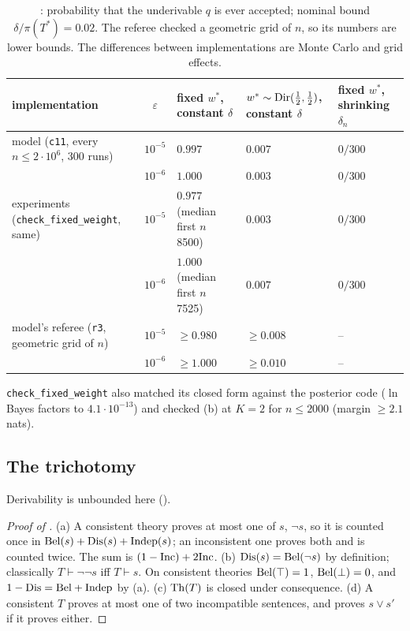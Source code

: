 \begin{table}[ht]
\centering\footnotesize
\begin{tabularx}{\textwidth}{@{}>{\raggedright\arraybackslash}Xc>{\raggedright\arraybackslash}p{2.9cm}>{\raggedright\arraybackslash}p{2.4cm}>{\raggedright\arraybackslash}p{2.0cm}@{}}
\toprule
implementation & $\varepsilon$ & fixed $w^*$, constant $\delta$ & $w^*\sim\mathrm{Dir}(\tfrac12,\tfrac12)$, constant $\delta$ & fixed $w^*$, shrinking $\delta_n$\\
\midrule
model (\texttt{c11}, every $n\le2\cdot10^6$, 300 runs) & $10^{-5}$ & $0.997$ & $0.007$ & $0/300$\\
 & $10^{-6}$ & $1.000$ & $0.003$ & $0/300$\\
experiments (\texttt{check\_fixed\_weight}, same) & $10^{-5}$ & $0.977$ (median first $n$ 8500) & $0.003$ & $0/300$\\
 & $10^{-6}$ & $1.000$ (median first $n$ 7525) & $0.007$ & $0/300$\\
model's referee (\texttt{r3}, geometric grid of $n$) & $10^{-5}$ & $\ge0.980$ & $\ge0.008$ & --\\
 & $10^{-6}$ & $\ge1.000$ & $\ge0.010$ & --\\
\bottomrule
\end{tabularx}
\caption{: probability that the underivable $q$ is ever accepted; nominal bound $\delta/\pi(T^*)=0.02$. The referee checked a geometric grid of $n$, so its numbers are lower bounds. The differences between implementations are Monte Carlo and grid effects.}\label{tab:sound:constant}
\end{table}

\noindent \texttt{check\_fixed\_weight} also matched its closed form against the posterior code ($\ln$ Bayes factors to $4.1\cdot10^{-13}$) and checked (b) at $K=2$ for $n\le2000$ (margin $\ge2.1$ nats).

\subsection{The trichotomy}\label{app:sound:tri}

Derivability is unbounded here ().

\begin{proof}[Proof of ]
(a) A consistent theory proves at most one of $s$, $\neg s$, so it is counted once in $\mathrm{Bel}(s)+\mathrm{Dis}(s)+\mathrm{Indep}(s)$; an inconsistent one proves both and is counted twice. The sum is $(1-\mathrm{Inc})+2\mathrm{Inc}$.
(b) $\mathrm{Dis}(s)=\mathrm{Bel}(\neg s)$ by definition; classically $T\vdash\neg\neg s$ iff $T\vdash s$. On consistent theories $\mathrm{Bel}(\top)=1$, $\mathrm{Bel}(\bot)=0$, and $1-\mathrm{Dis}=\mathrm{Bel}+\mathrm{Indep}$ by (a).
(c) $\mathrm{Th}(T)$ is closed under consequence.
(d) A consistent $T$ proves at most one of two incompatible sentences, and proves $s\vee s'$ if it proves either.
\end{proof}

